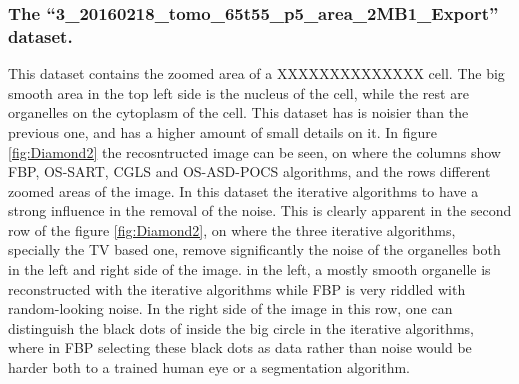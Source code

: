 \subsubsection{The ``3\_20160218\_tomo\_65t55\_p5\_area\_2MB1\_Export'' dataset.} This dataset contains the zoomed area of a XXXXXXXXXXXXXX cell. The big smooth area in the top left side is the nucleus of the cell, while the rest are organelles on the cytoplasm of the cell. This dataset has is noisier than the previous one, and has a higher amount of small details on it. In figure \ref{fig:Diamond2} the recosntructed image can be seen, on where the columns show FBP, OS-SART, CGLS and OS-ASD-POCS algorithms, and the rows different zoomed areas of the image. In this dataset the iterative algorithms to have a strong influence in the removal of the noise. This is clearly apparent in the second row of the figure \ref{fig:Diamond2}, on where the three iterative algorithms, specially the TV based one, remove significantly the noise of the organelles both in the left and right side of the image. in the left, a mostly smooth organelle is reconstructed with the iterative algorithms while FBP is very riddled with random-looking noise. In the right side of the image in this row, one can  distinguish the black dots of inside the big circle in the iterative algorithms, where in FBP selecting these black dots as data rather than noise would be harder both to a trained human eye or a segmentation algorithm.

